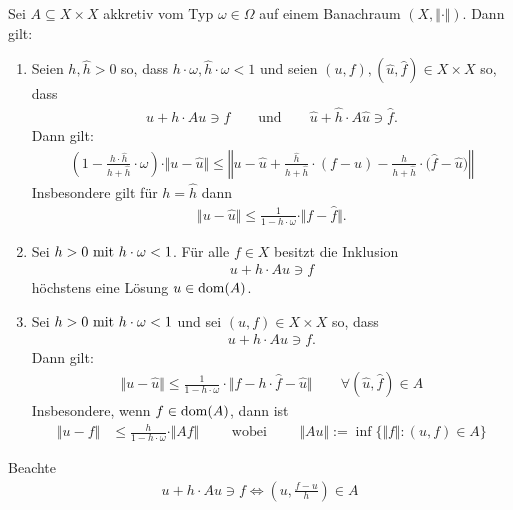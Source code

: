 \begin{theorem}\enter
	Sei $A\subseteq X\times X$ akkretiv vom Typ $\omega\in\Omega$ auf einem Banachraum $(X,\Vert\cdot\Vert)$. 
	Dann gilt:
	\begin{enumerate}[label=(\alph*)]
		\item Seien $h,\hat{h}>0$ so, dass $h\cdot\omega,\hat{h}\cdot\omega<1$ und seien $(u,f),(\hat{u},\hat{f})\in X\times X$ so, dass 
		\begin{align*}
			u+h\cdot Au\ni f\qquad\text{und}\qquad\hat{u}+\hat{h}\cdot A\hat{u}\ni\hat{f}.
		\end{align*}
		Dann gilt:
		\begin{align*}
			\left(1-\frac{h\cdot\hat{h}}{h+\hat{h}}\cdot\omega\right)\cdot\Vert u-\hat{u}\Vert
			\leq
			\left\Vert u-\hat{u}+\frac{\hat{h}}{h+\hat{h}}\cdot(f-u)-\frac{h}{h+\hat{h}}\cdot\big(\hat{f}-\hat{u}\big)\right\Vert
		\end{align*}
		Insbesondere gilt für $h=\hat{h}$ dann
		\begin{align*}
			\Vert u-\hat{u}\Vert
			\leq
			\frac{1}{1-h\cdot\omega}\cdot\Vert f-\hat{f}\Vert.
		\end{align*}
		\item Sei $h>0\mit h\cdot \omega<1$. Für alle $f\in X$ besitzt die Inklusion
		\begin{align*}
			u+h\cdot Au\ni f
		\end{align*}
		höchstens eine Lösung $u\in\dom(A)$.
		\item Sei $h>0\mit h\cdot\omega<1$ und sei $(u,f)\in X\times X$ so, dass 
		\begin{align*}
			u+h\cdot Au\ni f.
		\end{align*}
		Dann gilt:
		\begin{align*}
			\Vert u-\hat{u}\Vert
			\leq
			\frac{1}{1-h\cdot\omega}\cdot\big\Vert f-h\cdot\hat{f}-\hat{u}\big\Vert
			\qquad
			\forall(\hat{u},\hat{f})\in A
		\end{align*}
		Insbesondere, wenn $f\in\dom(A)$, dann ist
		\begin{align*}
			\Vert u-f\Vert
			&\leq
			\frac{h}{1-h\cdot\omega}\cdot\Vert Af\Vert
			\qquad
			\text{ wobei }
			\qquad
			\Vert Au\Vert:=\inf\big\lbrace\Vert f\Vert:(u,f)\in A\big\rbrace
		\end{align*}
	\end{enumerate}
\end{theorem}

\begin{bemerkung}
	Beachte
	\begin{align*}
		u+h\cdot Au\ni f\Longleftrightarrow\left(u,\frac{f-u}{h}\right)\in A
	\end{align*}
\end{bemerkung}

